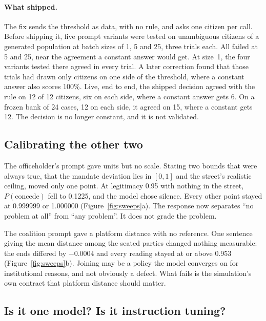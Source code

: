 \documentclass[11pt]{article}
\begin{document}
\paragraph{What shipped.} The fix sends the threshold as data, with no rule, and asks one citizen
per call. Before shipping it, five prompt variants were tested on unambiguous citizens of a
generated population at batch sizes of 1, 5 and 25, three trials each. All failed at 5 and 25,
near the agreement a constant answer would get. At size~1, the four variants tested there agreed
in every trial. A later correction found that those trials had drawn only citizens on one side of the threshold, where a
constant answer also scores 100\%. Live, end to end, the shipped decision agreed with the rule
on 12 of 12 citizens, six on each side, where a constant answer gets 6. On a frozen bank of 24
cases, 12 on each side, it agreed on 15, where a constant gets 12. The decision is no longer
constant, and it is not validated.

\subsection{Calibrating the other two}
\label{sec:calibration}

The officeholder's prompt gave units but no scale. Stating two bounds that were always true, that
the mandate deviation lies in $[0,1]$ and the street's realistic ceiling, moved only one point.
At legitimacy 0.95 with nothing in the street, $P(\text{concede})$ fell to 0.1225, and the model
chose silence. Every other point stayed at 0.999999 or 1.000000 (Figure~\ref{fig:sweeps}a). The
response now separates ``no problem at all'' from ``any problem''. It does not grade the problem.

The coalition prompt gave a platform distance with no reference. One sentence giving the mean
distance among the seated parties changed nothing measurable: the ends differed by $-0.0004$ and
every reading stayed at or above 0.953 (Figure~\ref{fig:sweeps}b). Joining may be a policy the model
converges on for institutional reasons, and not obviously a defect. What fails is the
simulation's own contract that platform distance should matter.

\subsection{Is it one model? Is it instruction tuning?}
\end{document}
